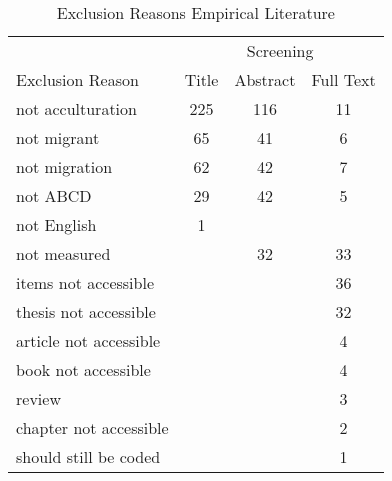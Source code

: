 \begin{table}
\begin{minipage}[t][\textheight][t]{\textwidth}

\caption{\label{tab:EmpiricalExclusion}Exclusion Reasons Empirical Literature}
\begin{tabular}[t]{lccc}
\toprule
\multicolumn{1}{c}{ } & \multicolumn{3}{c}{Screening} \\
\cmidrule(l{3pt}r{3pt}){2-4}
Exclusion Reason & Title & Abstract & Full Text\\
\midrule
not acculturation & 225 & 116 & 11\\
not migrant & 65 & 41 & 6\\
not migration & 62 & 42 & 7\\
not ABCD & 29 & 42 & 5\\
not English & 1 &  & \\
not measured &  & 32 & 33\\
items not accessible &  &  & 36\\
thesis not accessible &  &  & 32\\
article not accessible &  &  & 4\\
book not accessible &  &  & 4\\
review &  &  & 3\\
chapter not accessible &  &  & 2\\
should still be coded &  &  & 1\\
\bottomrule
\end{tabular}
\end{minipage}
\end{table}
